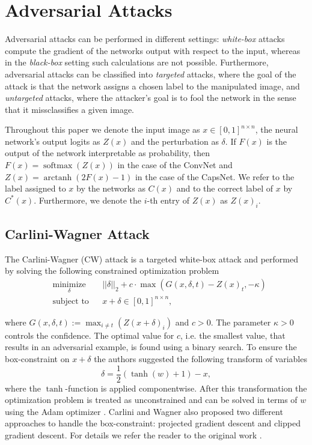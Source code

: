 \documentclass{article}
\DeclareMathOperator\arctanh{arctanh}
\DeclareMathOperator\softmax{softmax}
\begin{document}
\section{Adversarial Attacks}
\label{lab:attacks}

Adversarial attacks can be performed in different settings: 
\emph{white-box} attacks compute the gradient of the
networks output with respect to the input, whereas in the \emph{black-box}
setting such calculations are not possible. Furthermore, adversarial
attacks can be classified into \emph{targeted} attacks, where the goal of the
attack is that the network assigns a chosen label to the manipulated
image, and \emph{untargeted} attacks, where the attacker's goal is to fool
the network in the sense that it missclassifies a given image.

Throughout this paper we denote the input image as $x\in [0,1]^{n\times n}$, the neural network's output logits as $Z(x)$ and the perturbation as $\delta$. If $F(x)$ is the output of the network interpretable as probability, then
$F(x) = \softmax (Z(x))$ in the case of the ConvNet and $Z(x) = \arctanh(2F(x) - 1)$ in the case of the CapsNet. We refer to the label assigned to $x$ by the networks as $C(x)$  and to the correct label of $x$ by $C^*(x)$. Furthermore, we denote the $i$-th entry of $Z(x)$ as $Z(x)_i$.

\subsection{Carlini-Wagner Attack}

The Carlini-Wagner (CW) attack  is a targeted white-box attack and performed by solving the following constrained optimization problem
\begin{equation}
\begin{aligned}
& \underset{\delta}{\text{minimize}}
& & ||\delta||_2 + c \cdot \max(G(x,\delta,t)-Z(x)_t, -\kappa) \\
& \text{subject to}
& & x+\delta \in [0,1]^{n \times n},
\end{aligned}
\end{equation}

where $G(x,\delta,t) := \max_{i\neq t}(Z(x+\delta)_i)$ and $c>0$. The parameter  $\kappa > 0$ controls the confidence. The optimal value for $c$, i.e. the smallest value, that results in an adversarial example, is found using a binary search. To ensure the box-constraint on $x+\delta$ the authors suggested the following transform of variables 
\begin{equation}
\delta = \frac{1}{2}(\tanh(w)+1)-x,
\end{equation} 
where the $\tanh$-function is applied componentwise. After this
transformation the optimization problem is treated as unconstrained
and can be solved in terms of $w$ using the Adam
optimizer \cite{adam}. Carlini and Wagner  also proposed two
different approaches to handle the box-constraint: projected gradient
descent and clipped gradient descent. For details we refer the reader
to the original work \cite{carlini}.
\end{document}
